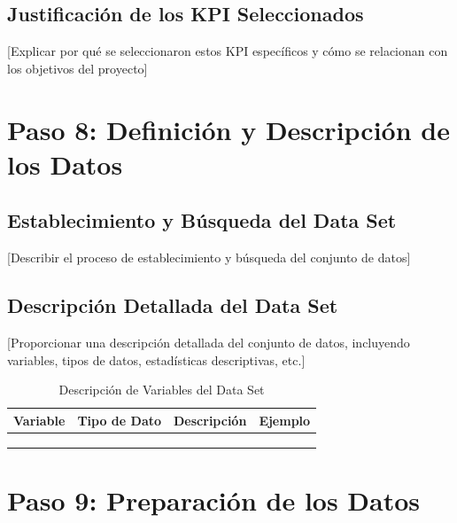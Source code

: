 \documentclass[12pt,letterpaper]{report}
\begin{document}
\subsection{Justificación de los KPI Seleccionados}
[Explicar por qué se seleccionaron estos KPI específicos y cómo se relacionan con los objetivos del proyecto]

\section{Paso 8: Definición y Descripción de los Datos}

\subsection{Establecimiento y Búsqueda del Data Set}
[Describir el proceso de establecimiento y búsqueda del conjunto de datos]

\subsection{Descripción Detallada del Data Set}
[Proporcionar una descripción detallada del conjunto de datos, incluyendo variables, tipos de datos, estadísticas descriptivas, etc.]

\begin{table}[H]
    \centering
    \begin{tabularx}{\textwidth}{|X|X|X|X|}
        \hline
        \textbf{Variable} & \textbf{Tipo de Dato} & \textbf{Descripción} & \textbf{Ejemplo} \\
        \hline
        & & & \\
        \hline
        & & & \\
        \hline
        & & & \\
        \hline
    \end{tabularx}
    \caption{Descripción de Variables del Data Set}
\end{table}

\section{Paso 9: Preparación de los Datos}
\end{document}
